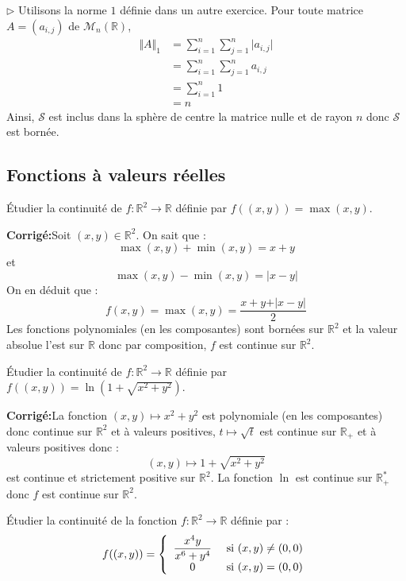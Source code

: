 \documentclass[a4paper,twoside,french,11pt]{VcCours}
\newcommand{\corr}{\textbf{Corrigé:}}
\begin{document}
$\rhd$ Utilisons la norme $1$ définie dans un autre exercice. Pour toute matrice $A=(a_{i,j})$ de $\mathcal{M}_n(\mathbb{R})$,
\begin{align*}
\Vert A \Vert_1 & = \sum_{i = 1}^{n} \sum_{j = 1}^{n} \vert a_{i,j} \vert \\
& = \sum_{i = 1}^{n} \sum_{j = 1}^{n}  a_{i,j}  \\
 & = \sum_{i = 1}^{n} 1 \\
 & = n
\end{align*}
Ainsi, $\mathcal{S}$ est inclus dans la sphère de centre la matrice nulle et de rayon $n$ donc $\mathcal{S}$ est bornée.

\subsection{Fonctions à valeurs réelles}


\begin{Exercice}{} Étudier la continuité de $f : \mathbb{R}^2 \rightarrow \mathbb{R}$ définie par $ f((x,y))=  \max(x,y)$.
\end{Exercice}

\corr Soit $(x,y) \in \mathbb{R}^2$. On sait que :
$$ \max(x,y)+ \min(x,y) = x+y$$
et 
$$ \max(x,y)-\min(x,y) = \vert x-y \vert$$
On en déduit que :
$$ f(x,y)= \max(x,y) = \dfrac{x+y+ \vert x-y \vert}{2}$$
Les fonctions polynomiales (en les composantes) sont bornées sur $\mathbb{R}^2$ et la valeur absolue l'est sur $\mathbb{R}$ donc par composition, $f$ est continue sur $\mathbb{R}^2$.

\begin{Exercice}{} Étudier la continuité de $f : \mathbb{R}^2 \rightarrow \mathbb{R}$ définie par $f((x,y))= \ln(1 + \sqrt{x^2+y^2})$.
\end{Exercice}

\corr La fonction $(x,y) \mapsto x^2+y^2$ est polynomiale (en les composantes) donc continue sur $\mathbb{R}^2$ et à valeurs positives, $t \mapsto \sqrt{t}$ est continue sur $\mathbb{R}_+$ et à valeurs positives donc :
$$ (x,y) \mapsto 1+ \sqrt{x^2+y^2}$$
est continue et strictement positive sur $\mathbb{R}^2$. La fonction $\ln$ est continue sur $\mathbb{R}_+^{*}$ donc $f$ est continue sur $\mathbb{R}^2$.

\begin{Exercice}{} Étudier la continuité de la fonction $f : \mathbb{R}^2 \rightarrow \mathbb{R}$ définie par :
$$ f((x,y)) = \left\lbrace \begin{array}{cl}
\dfrac{x^4 y}{x^6+y^4} & \hbox{ si } (x,y) \neq (0,0) \\
0 & \hbox{ si } (x,y)=(0,0) \\
\end{array}\right.$$
\end{Exercice}
\end{document}
